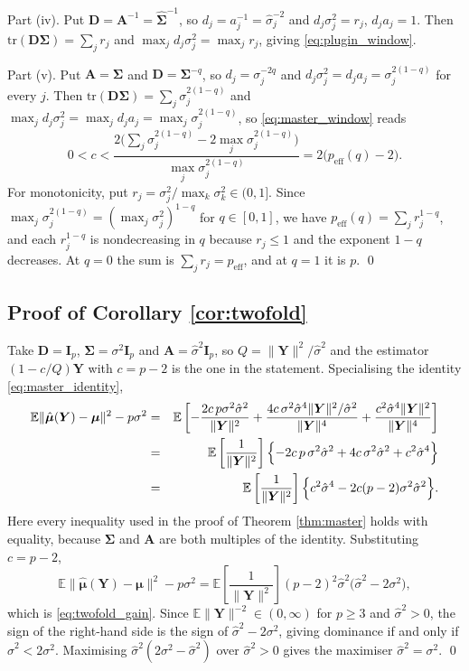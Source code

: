 \documentclass[pdflatex,sn-mathphys-num]{sn-jnl}%
\theoremstyle{thmstyleone}%
\theoremstyle{thmstyletwo}%
\theoremstyle{thmstylethree}%
\newenvironment{revblock}{\color{blue}}{}
\newcommand{\peff}{p_{\mathrm{eff}}}
\newcommand{\peffq}[1]{p_{\mathrm{eff}}(#1)}
\newcommand{\tr}{\mathrm{tr}}
\newcommand{\E}{\mathbb{E}}
\begin{document}
\begin{appendices}
Part (iv). Put $\bm D=\bm A^{-1}=\widehat{\bm\Sigma}^{-1}$, so $d_j=a^{-1}_j=\hat\sigma^{-2}_j$ and $d_j\sigma^2_j=r_j$, $d_ja_j=1$. Then $\tr(\bm D\bm\Sigma)=\sum_jr_j$ and $\max_jd_j\sigma^2_j=\max_jr_j$, giving \eqref{eq:plugin_window}.

\begin{revblock}
Part (v). Put $\bm A=\bm\Sigma$ and $\bm D=\bm\Sigma^{-q}$, so $d_j=\sigma_j^{-2q}$ and $d_j\sigma^2_j=d_ja_j=\sigma_j^{2(1-q)}$ for every $j$. Then $\tr(\bm D\bm\Sigma)=\sum_j\sigma_j^{2(1-q)}$ and $\max_jd_j\sigma^2_j=\max_jd_ja_j=\max_j\sigma_j^{2(1-q)}$, so \eqref{eq:master_window} reads
\begin{equation}
0<c<\frac{2\bigl(\sum_j\sigma_j^{2(1-q)}-2\max_j\sigma_j^{2(1-q)}\bigr)}{\max_j\sigma_j^{2(1-q)}}=2\bigl(\peffq{q}-2\bigr).
\end{equation}
For monotonicity, put $r_j=\sigma^2_j/\max_k\sigma^2_k\in(0,1]$. Since $\max_j\sigma_j^{2(1-q)}=(\max_j\sigma^2_j)^{1-q}$ for $q\in[0,1]$, we have $\peffq{q}=\sum_jr_j^{1-q}$, and each $r_j^{1-q}$ is nondecreasing in $q$ because $r_j\le1$ and the exponent $1-q$ decreases. At $q=0$ the sum is $\sum_jr_j=\peff$, and at $q=1$ it is $p$.
\end{revblock}
\qed

\subsection*{Proof of Corollary \ref{cor:twofold}}

Take $\bm D=\bm I_p$, $\bm\Sigma=\sigma^2\bm I_p$ and $\bm A=\hat\sigma^2\bm I_p$, so $Q=\|\bm Y\|^2/\hat\sigma^2$ and the estimator $(1-c/Q)\bm Y$ with $c=p-2$ is the one in the statement. Specialising the identity \eqref{eq:master_identity},
\begin{eqnarray}
\E\|\hat{\bm\mu}(\bm Y)-\bm\mu\|^2-p\sigma^2
&=&
\E\left[
-\frac{2c\,p\sigma^2\hat\sigma^2}{\|\bm Y\|^2}
+\frac{4c\,\sigma^2\hat\sigma^{4}\|\bm Y\|^2/\hat\sigma^2}{\|\bm Y\|^{4}}
+\frac{c^{2}\hat\sigma^{4}\|\bm Y\|^2}{\|\bm Y\|^{4}}
\right]
\cr
&=&
\E\left[\frac{1}{\|\bm Y\|^2}\right]
\Bigl\{
-2c\,p\,\sigma^2\hat\sigma^2+4c\,\sigma^2\hat\sigma^2+c^{2}\hat\sigma^{4}
\Bigr\}
\cr
&=&
\E\left[\frac{1}{\|\bm Y\|^2}\right]
\Bigl\{
c^{2}\hat\sigma^{4}-2c(p-2)\sigma^2\hat\sigma^2
\Bigr\}.
\end{eqnarray}
Here every inequality used in the proof of Theorem \ref{thm:master} holds with equality, because $\bm\Sigma$ and $\bm A$ are both multiples of the identity. Substituting $c=p-2$,
\begin{equation}
\E\|\hat{\bm\mu}(\bm Y)-\bm\mu\|^2-p\sigma^2
=
\E\left[\frac{1}{\|\bm Y\|^2}\right]
(p-2)^2\hat\sigma^2\bigl(\hat\sigma^2-2\sigma^2\bigr),
\end{equation}
which is \eqref{eq:twofold_gain}. Since $\E\|\bm Y\|^{-2}\in(0,\infty)$ for $p\ge3$ and $\hat\sigma^2>0$, the sign of the right-hand side is the sign of $\hat\sigma^2-2\sigma^2$, giving dominance if and only if $\hat\sigma^2<2\sigma^2$. Maximising $\hat\sigma^2(2\sigma^2-\hat\sigma^2)$ over $\hat\sigma^2>0$ gives the maximiser $\hat\sigma^2=\sigma^2$. \qed


\end{appendices}
\end{document}
